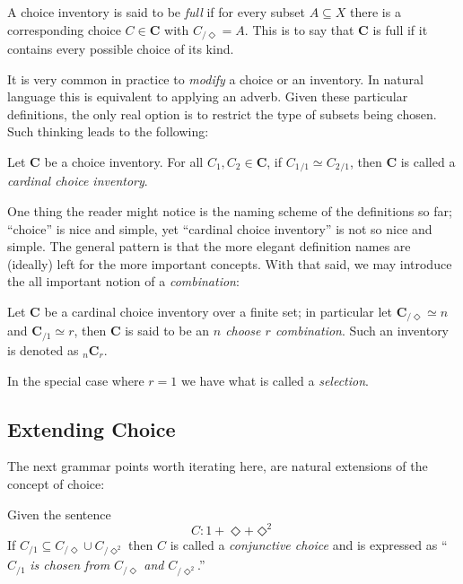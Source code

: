 \documentclass[twoside]{book}
\newcommand{\pass}[1][\Diamond]{\ensuremath{{_{\!/{#1}}}}}
\newcommand{\passes}[2][\Diamond]{\ensuremath{{_{\!/{#1}^{#2}}}}}
\newcommand{\syntaxes}[1][\Diamond]{\ensuremath{1+{#1}+{#1}^2}}
\renewcommand{\bold}[1][C]{\ensuremath{{\mathbf #1}}}
\newcommand{\nCr}[1][C]{\ensuremath{{_n{\mathbf #1}_r}}}
\newenvironment{definition}[1][Definition]{\begin{trivlist}
\item[\hskip \labelsep {\bfseries Definition (#1):}]}{\end{trivlist}}
\begin{document}
 A choice inventory is said to be \emph{full} if for every subset $ A\subseteq X $ there is a corresponding
choice $ C\in\bold $ with $ C\pass=A $.  This is to say that $ \bold $ is full if it contains every possible
choice of its kind.

It is very common in practice to \emph{modify} a choice or an inventory.  In natural language
this is equivalent to applying an adverb.  Given these particular definitions, the only real option
is to restrict the type of subsets being chosen.  Such thinking leads to the following:

\begin{definition}[\hypertarget{CardinalChoiceInventory}{\hyperlink{oCardinalChoiceInventory}{Cardinal Choice Inventory}}]

Let $ \bold $ be a choice inventory.  For all $ C_1,C_2\in\bold $, if $ C_1\pass[1]\simeq C_2\pass[1] $,
then $ \bold $ is called a \emph{cardinal choice inventory}.

\end{definition}

One thing the reader might notice is the naming scheme of the definitions so far; ``choice''
is nice and simple, yet ``cardinal choice inventory'' is not so nice and simple.  The general
pattern is that the more elegant definition names are (ideally) left for the more important concepts.
With that said, we may introduce the all important notion of a \emph{combination}:

\begin{definition}[\hypertarget{Combination}{\hyperlink{oCombination}{Combination}}]

Let $ \bold $ be a cardinal choice inventory over a finite set; in particular let $ \bold\pass\simeq n $
and $ \bold\pass[1]\simeq r $, then $ \bold $ is said to be an \emph{$ n $ choose $ r $ combination}.
Such an inventory is denoted as $ \nCr $.

\end{definition}

In the special case where $ r=1 $ we have what is called a \emph{selection}.

\subsection{Extending Choice}

The next grammar points worth iterating here, are natural extensions of the concept of choice:

\begin{definition}[\hypertarget{ConjunctiveChoice}{\hyperlink{oConjunctiveChoice}{Conjunctive Choice}}]

Given the sentence
$$ C:\syntaxes $$
If $ C\pass[1]\subseteq C\pass\cup C\passes{2} $
then $ C $ is called a \emph{conjunctive choice} and is expressed as ``$ C\pass[1] $
\emph{is chosen from} $ C\pass $ \emph{and} $ C\passes{2} $.''

\end{definition}
\end{document}
